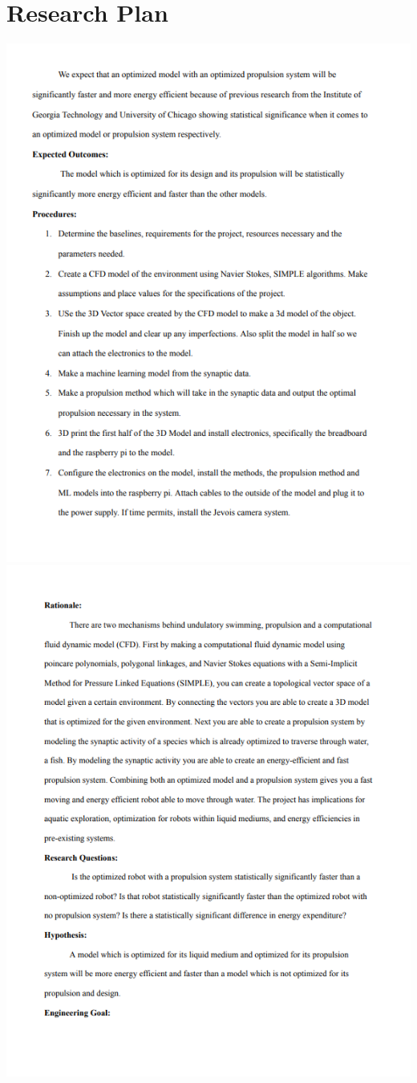 \documentclass{article}
\begin{document}
\part{Research Plan}
\includegraphics[width=\textwidth]{media/image6}
\newpage
\includegraphics[width=\textwidth]{media/image9}
\end{document}

